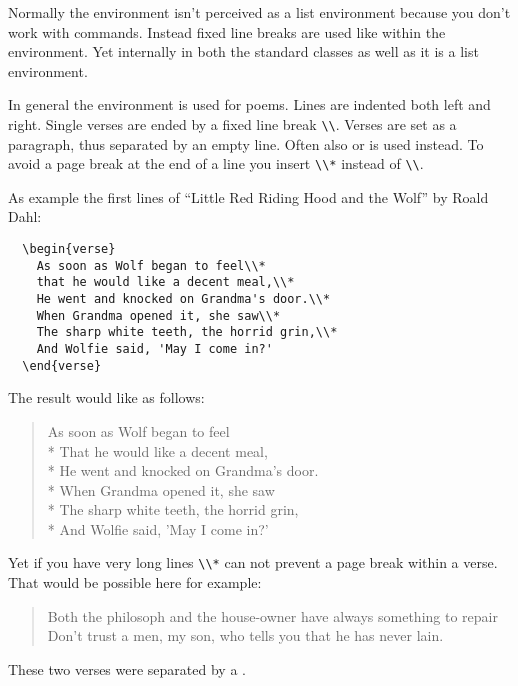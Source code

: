 \begin{Declaration}
\end{Declaration}%
%
Normally the  environment isn't perceived as a list
environment because you don't work with  commands. Instead
fixed line breaks are used like within the 
environment. Yet internally in both the standard classes as well
as {\KOMAScript} it is a list environment.

In general the  environment is used for
poems.  Lines are indented both left and right. Single
verses are ended by a fixed line break \verb|\\|. Verses are set as a
paragraph, thus separated by an empty line. Often also
 or 
is used instead. To avoid a page break at the end of a line you insert
\verb|\\*| instead of \verb|\\|.
\begin{Example}
  As example the first lines of ``Little Red Riding Hood and the
  Wolf'' by Roald Dahl: 
\begin{lstlisting}
  \begin{verse}
    As soon as Wolf began to feel\\*
    that he would like a decent meal,\\*
    He went and knocked on Grandma's door.\\*
    When Grandma opened it, she saw\\*
    The sharp white teeth, the horrid grin,\\*
    And Wolfie said, 'May I come in?'
  \end{verse}
\end{lstlisting}
  The result would like as follows:
  \begin{ShowOutput}
  \begin{verse}
    As soon as Wolf began to feel\\*
    That he would like a decent meal,\\*
    He went and knocked on Grandma's door.\\*
    When Grandma opened it, she saw\\*
    The sharp white teeth, the horrid grin,\\*
    And Wolfie said, 'May I come in?'
  \end{verse}
  \end{ShowOutput}
  Yet if you have very long lines \verb|\\*| can not prevent a page
  break within a verse. That would be possible here for example:
  \begin{ShowOutput}
  \begin{verse}
    Both the philosoph and the house-owner\nopagebreak
    have always something to repair\\
    \bigskip
    Don't trust a men, my son, who tells you\nopagebreak
    that he has never lain.
  \end{verse}
  \end{ShowOutput}

  These two verses were separated by a .
\end{Example}
